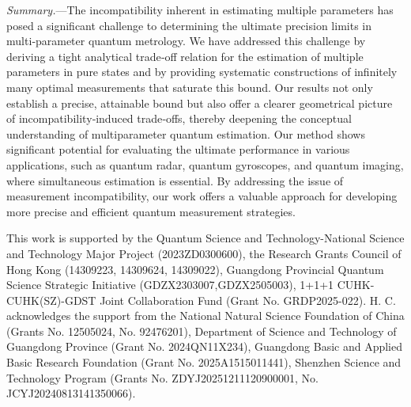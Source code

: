 \documentclass[
aps,
prl,
twocolumn,

superscriptaddress]{revtex4-2}
\begin{document}
\textit{Summary.}---The incompatibility inherent in estimating multiple parameters has posed a significant challenge to determining the ultimate precision limits in multi‑parameter quantum metrology. We have addressed this challenge by deriving a tight analytical trade‑off relation for the estimation of multiple parameters in pure states and by providing systematic constructions of infinitely many optimal measurements that saturate this bound. Our results not only establish a precise, attainable bound but also offer a clearer geometrical picture of incompatibility‑induced trade‑offs, thereby deepening the conceptual understanding of multiparameter quantum estimation. Our method shows significant potential for evaluating the ultimate performance in various applications, such as quantum radar, quantum gyroscopes, and quantum imaging, where simultaneous estimation is essential. By addressing the issue of measurement incompatibility, our work offers a valuable approach for developing more precise and efficient quantum measurement strategies.

\begin{acknowledgments}
This work is supported by the Quantum Science and Technology-National Science and Technology Major Project (2023ZD0300600), the Research Grants Council of Hong Kong (14309223, 14309624, 14309022), Guangdong Provincial Quantum Science Strategic
Initiative (GDZX2303007,GDZX2505003), 1+1+1 CUHK-CUHK(SZ)-GDST Joint Collaboration Fund (Grant No. GRDP2025-022). H. C. acknowledges the support from the National Natural Science Foundation of China (Grants No. 12505024, No. 92476201), Department of Science and Technology of Guangdong Province (Grant No. 2024QN11X234), Guangdong Basic and Applied Basic Research Foundation (Grant No. 2025A1515011441), Shenzhen Science and Technology Program (Grants No. ZDYJ20251211120900001, No. JCYJ20240813141350066).
\end{acknowledgments}
\end{document}
